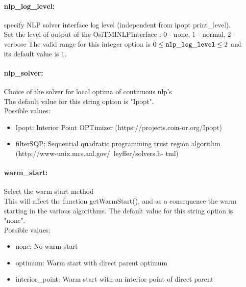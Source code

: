 \paragraph{nlp\_log\_level:} specify NLP solver interface log level (independent from ipopt print\_level). $\;$ \\
 Set the level of output of the OsiTMINLPInterface
: 0 - none, 1 - normal, 2 - verbose The valid range for this integer option is
$0 \le {\tt nlp\_log\_level } \le 2$
and its default value is $1$.


\paragraph{nlp\_solver:} Choice of the solver for local optima of continuous nlp's $\;$ \\

The default value for this string option is "Ipopt".
\\ 
Possible values:
\begin{itemize}
   \item Ipopt: Interior Point OPTimizer
(https://projects.coin-or.org/Ipopt)
   \item filterSQP: Sequential quadratic programming trust region
algorithm
(http://www-unix.mcs.anl.gov/~leyffer/solvers.h-
tml)
\end{itemize}

\paragraph{warm\_start:} Select the warm start method $\;$ \\
 This will affect the function getWarmStart(), and
as a consequence the warm starting in the various
algorithms.
The default value for this string option is "none".
\\ 
Possible values:
\begin{itemize}
   \item none: No warm start
   \item optimum: Warm start with direct parent optimum
   \item interior\_point: Warm start with an interior point of direct
parent
\end{itemize}

